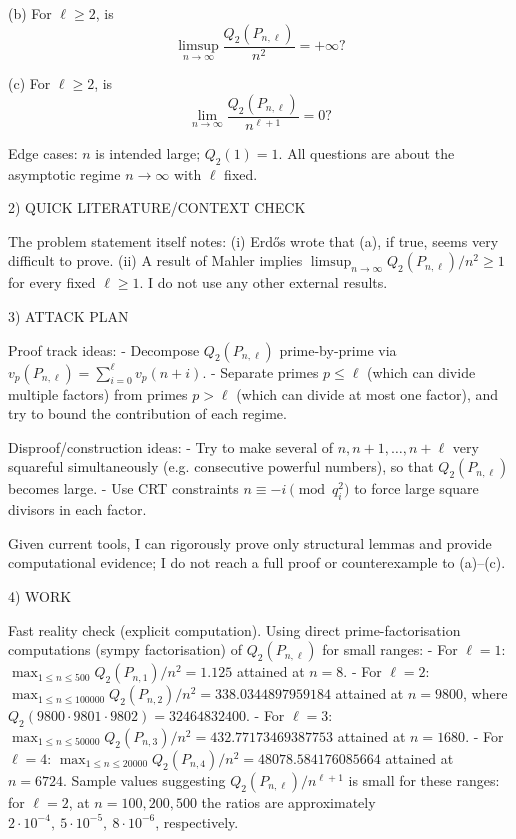 (b) For \(\ell\ge 2\), is
\[\limsup_{n\to\infty} \frac{Q_2(P_{n,\ell})}{n^2}=+\infty?\]

(c) For \(\ell\ge 2\), is
\[\lim_{n\to\infty} \frac{Q_2(P_{n,\ell})}{n^{\ell+1}}=0?\]

Edge cases: \(n\) is intended large; \(Q_2(1)=1\). All questions are about the asymptotic regime \(n\to\infty\) with \(\ell\) fixed.

2) QUICK LITERATURE/CONTEXT CHECK

The problem statement itself notes:
(i) Erd\H{o}s wrote that (a), if true, seems very difficult to prove.
(ii) A result of Mahler implies \(\limsup_{n\to\infty} Q_2(P_{n,\ell})/n^2\ge 1\) for every fixed \(\ell\ge 1\).
I do not use any other external results.

3) ATTACK PLAN

Proof track ideas:
- Decompose \(Q_2(P_{n,\ell})\) prime-by-prime via \(v_p(P_{n,\ell})=\sum_{i=0}^{\ell} v_p(n+i)\).
- Separate primes \(p\le \ell\) (which can divide multiple factors) from primes \(p>\ell\) (which can divide at most one factor), and try to bound the contribution of each regime.

Disproof/construction ideas:
- Try to make several of \(n,n+1,\dots,n+\ell\) very squareful simultaneously (e.g. consecutive powerful numbers), so that \(Q_2(P_{n,\ell})\) becomes large.
- Use CRT constraints \(n\equiv -i\pmod{q_i^2}\) to force large square divisors in each factor.

Given current tools, I can rigorously prove only structural lemmas and provide computational evidence; I do not reach a full proof or counterexample to (a)–(c).

4) WORK

Fast reality check (explicit computation).
Using direct prime-factorisation computations (sympy factorisation) of \(Q_2(P_{n,\ell})\) for small ranges:
- For \(\ell=1\): \(\max_{1\le n\le 500} Q_2(P_{n,1})/n^2 = 1.125\) attained at \(n=8\).
- For \(\ell=2\): \(\max_{1\le n\le 100000} Q_2(P_{n,2})/n^2 = 338.0344897959184\) attained at \(n=9800\), where
  \(Q_2(9800\cdot 9801\cdot 9802)=32464832400\).
- For \(\ell=3\): \(\max_{1\le n\le 50000} Q_2(P_{n,3})/n^2 = 432.77173469387753\) attained at \(n=1680\).
- For \(\ell=4\): \(\max_{1\le n\le 20000} Q_2(P_{n,4})/n^2 = 48078.584176085664\) attained at \(n=6724\).
Sample values suggesting \(Q_2(P_{n,\ell})/n^{\ell+1}\) is small for these ranges:
for \(\ell=2\), at \(n=100,200,500\) the ratios are approximately \(2\cdot 10^{-4},\ 5\cdot 10^{-5},\ 8\cdot 10^{-6}\), respectively.

